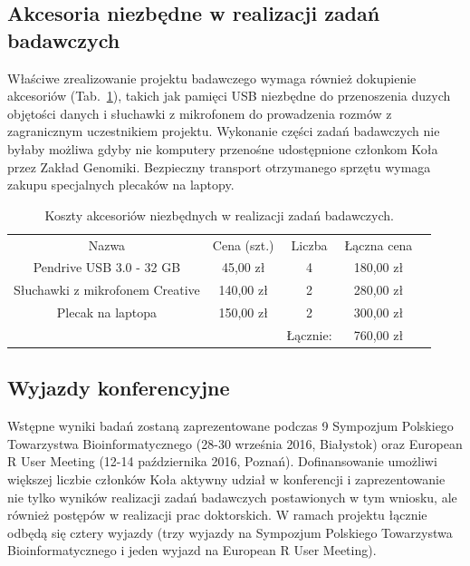 \documentclass{article}
\begin{document}
\subsection{Akcesoria niezbędne w realizacji zadań badawczych}

Właściwe zrealizowanie projektu badawczego wymaga również dokupienie 
akcesoriów (Tab.~\ref{tab:akcesoria}), takich jak pamięci USB niezbędne do 
przenoszenia duzych objętości danych i słuchawki z mikrofonem do prowadzenia 
rozmów z zagranicznym uczestnikiem projektu. Wykonanie części zadań badawczych 
nie byłaby możliwa gdyby nie komputery przenośne udostępnione członkom Koła 
przez Zakład Genomiki. Bezpieczny transport otrzymanego sprzętu wymaga zakupu 
specjalnych plecaków na laptopy.

\begin{table}[]
\centering
\caption{Koszty akcesoriów niezbędnych w realizacji zadań badawczych.}
\label{tab:akcesoria}
\begin{tabular}{ccccc}
\cline{1-4}
\multicolumn{1}{|c|}{Nazwa}                           & \multicolumn{1}{c|}{Cena 
(szt.)} & \multicolumn{1}{c|}{Liczba} & \multicolumn{1}{c|}{Łączna cena} &       
               \\ \cline{1-4}
\multicolumn{1}{|c|}{Pendrive USB 3.0 - 32 GB}        & 
\multicolumn{1}{c|}{45,00 zł}    & \multicolumn{1}{c|}{4}      & 
\multicolumn{1}{c|}{180,00 zł}   &                      \\ \cline{1-4}
\multicolumn{1}{|c|}{Słuchawki z mikrofonem Creative} & 
\multicolumn{1}{c|}{140,00 zł}   & \multicolumn{1}{c|}{2}      & 
\multicolumn{1}{c|}{280,00 zł}   &                      \\ \cline{1-4}
\multicolumn{1}{|c|}{Plecak na laptopa}               & 
\multicolumn{1}{c|}{150,00 zł}   & \multicolumn{1}{c|}{2}      & 
\multicolumn{1}{c|}{300,00 zł}   & \multicolumn{1}{l}{} \\ \cline{1-4}
                                                      &                          
        & Łącznie:                    & 760,00 zł                        &       
              
\end{tabular}
\end{table}

\subsection{Wyjazdy konferencyjne}

Wstępne wyniki badań zostaną zaprezentowane podczas 9 Sympozjum Polskiego 
Towarzystwa Bioinformatycznego (28-30 września 2016, Białystok) oraz European R 
User Meeting (12-14 października 2016, Poznań). Dofinansowanie 
umożliwi większej liczbie członków Koła aktywny udział w konferencji i 
zaprezentowanie nie tylko wyników realizacji zadań badawczych postawionych w tym 
wniosku, ale również postępów w realizacji prac doktorskich. W ramach projektu 
łącznie odbędą się cztery wyjazdy (trzy wyjazdy na Sympozjum Polskiego 
Towarzystwa Bioinformatycznego i jeden wyjazd na European R 
User Meeting).
\end{document}
